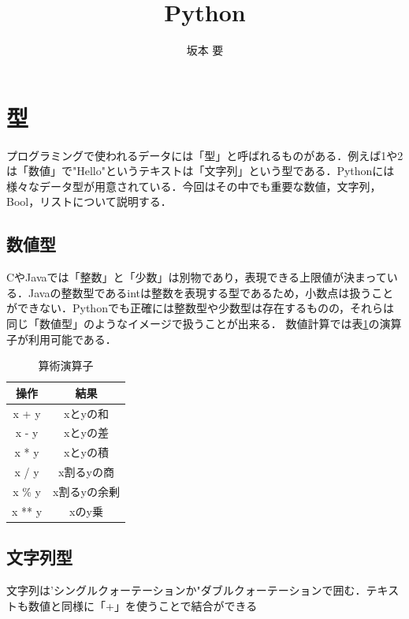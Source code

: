\documentclass[11pt]{jarticle}
\title{Python}
\author{坂本 要}
\begin{document}
\maketitle
\section{型}
プログラミングで使われるデータには「型」と呼ばれるものがある．例えば1や2は「数値」で"Hello"というテキストは「文字列」という型である．Pythonには様々なデータ型が用意されている．今回はその中でも重要な数値，文字列，Bool，リストについて説明する．
\subsection{数値型}
CやJavaでは「整数」と「少数」は別物であり，表現できる上限値が決まっている．Javaの整数型であるintは整数を表現する型であるため，小数点は扱うことができない．Pythonでも正確には整数型や少数型は存在するものの，それらは同じ「数値型」のようなイメージで扱うことが出来る．
数値計算では表\ref{arithmetic operator}の演算子が利用可能である．
\begin{table}[h]
\centering
 \caption{算術演算子}
  \begin{tabular}{|c|c|} \hline
    操作 & 結果  \\ \hline \hline
    x + y & xとyの和 \\ \hline
    x - y & xとyの差 \\ \hline
    x * y & xとyの積 \\ \hline
    x / y & x割るyの商 \\ \hline
    x \% y & x割るyの余剰 \\ \hline
    x ** y & xのy乗 \\ \hline
  \end{tabular} 
 \label{arithmetic operator}
\end{table}

\subsection{文字列型}
文字列は'シングルクォーテーションか"ダブルクォーテーションで囲む．テキストも数値と同様に「+」を使うことで結合ができる
\end{document}
